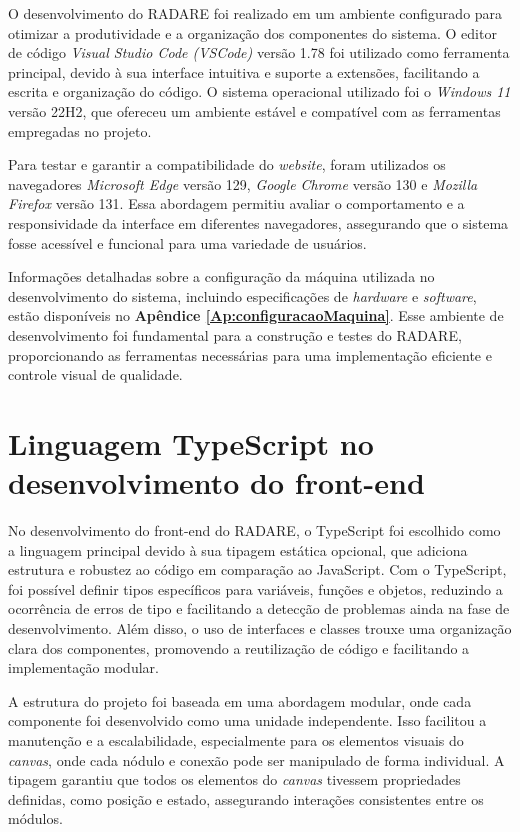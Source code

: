 O desenvolvimento do RADARE foi realizado em um ambiente configurado para otimizar a produtividade e a organização dos componentes do sistema. O editor de código \textit{Visual Studio Code (VSCode)} versão 1.78 foi utilizado como ferramenta principal, devido à sua interface intuitiva e suporte a extensões, facilitando a escrita e organização do código. O sistema operacional utilizado foi o \textit{Windows 11} versão 22H2, que ofereceu um ambiente estável e compatível com as ferramentas empregadas no projeto.

Para testar e garantir a compatibilidade do \textit{website}, foram utilizados os navegadores \textit{Microsoft Edge} versão 129, \textit{Google Chrome} versão 130 e \textit{Mozilla Firefox} versão 131. Essa abordagem permitiu avaliar o comportamento e a responsividade da interface em diferentes navegadores, assegurando que o sistema fosse acessível e funcional para uma variedade de usuários.

Informações detalhadas sobre a configuração da máquina utilizada no desenvolvimento do sistema, incluindo especificações de \textit{hardware} e \textit{software}, estão disponíveis no \textbf{Apêndice \ref{Ap:configuracaoMaquina}}. Esse ambiente de desenvolvimento foi fundamental para a construção e testes do RADARE, proporcionando as ferramentas necessárias para uma implementação eficiente e controle visual de qualidade.
    
\section{Linguagem TypeScript no desenvolvimento do front-end}

No desenvolvimento do front-end do RADARE, o TypeScript foi escolhido como a linguagem principal devido à sua tipagem estática opcional, que adiciona estrutura e robustez ao código em comparação ao JavaScript. Com o TypeScript, foi possível definir tipos específicos para variáveis, funções e objetos, reduzindo a ocorrência de erros de tipo e facilitando a detecção de problemas ainda na fase de desenvolvimento. Além disso, o uso de interfaces e classes trouxe uma organização clara dos componentes, promovendo a reutilização de código e facilitando a implementação modular.

A estrutura do projeto foi baseada em uma abordagem modular, onde cada componente foi desenvolvido como uma unidade independente. Isso facilitou a manutenção e a escalabilidade, especialmente para os elementos visuais do \textit{canvas}, onde cada nódulo e conexão pode ser manipulado de forma individual. A tipagem garantiu que todos os elementos do \textit{canvas} tivessem propriedades definidas, como posição e estado, assegurando interações consistentes entre os módulos.


